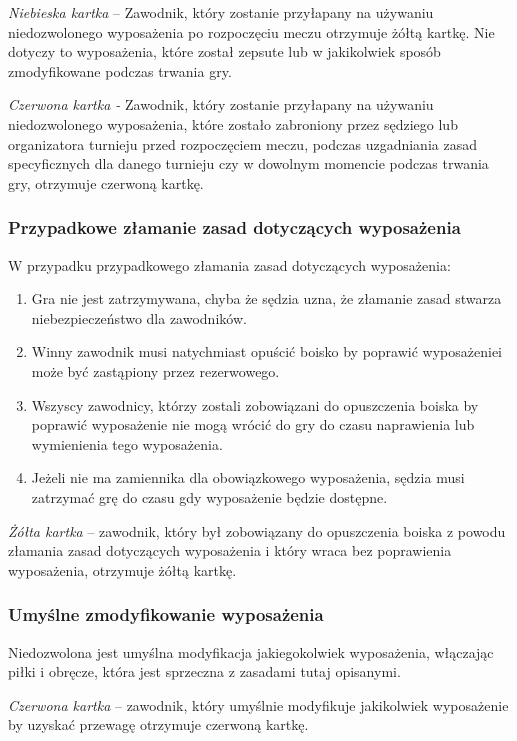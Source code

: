 \documentclass[12pt]{article}
\begin{document}
\emph{Niebieska kartka} -- Zawodnik, który zostanie przyłapany na
używaniu niedozwolonego wyposażenia po rozpoczęciu meczu otrzymuje żółtą
kartkę. Nie dotyczy to wyposażenia, które został zepsute lub w
jakikolwiek sposób zmodyfikowane podczas trwania gry.

\emph{Czerwona kartka -} Zawodnik, który zostanie przyłapany na używaniu
niedozwolonego wyposażenia, które zostało zabroniony przez sędziego lub
organizatora turnieju przed rozpoczęciem meczu, podczas uzgadniania
zasad specyficznych dla danego turnieju czy w dowolnym momencie podczas
trwania gry, otrzymuje czerwoną kartkę.

\subsubsection{Przypadkowe złamanie zasad dotyczących wyposażenia}
 W przypadku przypadkowego złamania zasad dotyczących wyposażenia:

\begin{enumerate}
\item
    Gra nie jest zatrzymywana, chyba że sędzia uzna, że złamanie zasad
  stwarza niebezpieczeństwo dla zawodników.
  \item
    Winny zawodnik musi natychmiast opuścić boisko by poprawić
  wyposażeniei może być zastąpiony przez rezerwowego.
  \item
    Wszyscy zawodnicy, którzy zostali zobowiązani do opuszczenia boiska by
  poprawić wyposażenie nie mogą wrócić do gry do czasu naprawienia lub
  wymienienia tego wyposażenia.
  \item
    Jeżeli nie ma zamiennika dla obowiązkowego wyposażenia, sędzia musi
  zatrzymać grę do czasu gdy wyposażenie będzie dostępne.
  \end{enumerate}

\emph{Żółta kartka} -- zawodnik, który był zobowiązany do opuszczenia
boiska z powodu złamania zasad dotyczących wyposażenia i który wraca bez
poprawienia wyposażenia, otrzymuje żółtą kartkę.

\subsubsection{Umyślne zmodyfikowanie wyposażenia}
Niedozwolona jest
umyślna modyfikacja jakiegokolwiek wyposażenia, włączając piłki i
obręcze, która jest sprzeczna z zasadami tutaj opisanymi.

\emph{Czerwona kartka} -- zawodnik, który umyślnie modyfikuje
jakikolwiek wyposażenie by uzyskać przewagę otrzymuje czerwoną kartkę.
\end{document}
